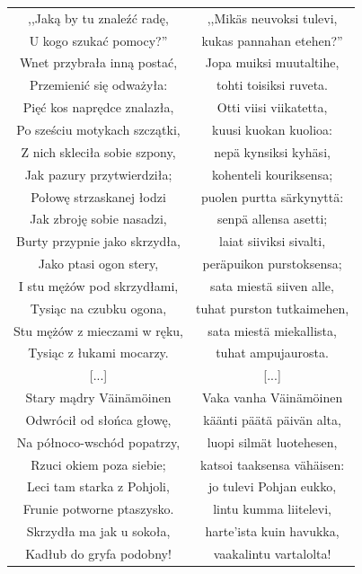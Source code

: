 \documentclass[11pt,a4paper,twoside]{report}
\begin{document}
{\centering
\small
\begin{longtable}{c c}
,,Jaką by tu znaleźć radę, & ,,Mikäs neuvoksi tulevi, \\
U kogo szukać pomocy?'' & kukas pannahan etehen?'' \\
Wnet przybrała inną postać, & Jopa muiksi muutaltihe, \\
Przemienić się odważyła: & tohti toisiksi ruveta. \\
Pięć kos naprędce znalazła, & Otti viisi viikatetta, \\
Po sześciu motykach szczątki, & kuusi kuokan kuolioa: \\
Z nich skleciła sobie szpony, & nepä kynsiksi kyhäsi, \\
Jak pazury przytwierdziła; & kohenteli kouriksensa; \\
Połowę strzaskanej łodzi & puolen purtta särkynyttä: \\
Jak zbroję sobie nasadzi, & senpä allensa asetti; \\
Burty przypnie jako skrzydła, & laiat siiviksi sivalti, \\
Jako ptasi ogon stery, & peräpuikon purstoksensa; \\
I stu mężów pod skrzydłami, & sata miestä siiven alle, \\
Tysiąc na czubku ogona, & tuhat purston tutkaimehen, \\
Stu mężów z mieczami w ręku, & sata miestä miekallista, \\
Tysiąc z łukami mocarzy. & tuhat ampujaurosta. \\
{[...]} & {[...]} \\
Stary mądry Väinämöinen & Vaka vanha Väinämöinen \\
Odwrócił od słońca głowę, & käänti päätä päivän alta, \\
Na północo-wschód popatrzy, & luopi silmät luotehesen, \\
Rzuci okiem poza siebie; & katsoi taaksensa vähäisen: \\
Leci tam starka z Pohjoli, & jo tulevi Pohjan eukko, \\
Frunie potworne ptaszysko. & lintu kumma liitelevi, \\
Skrzydła ma jak u sokoła, & harte'ista kuin havukka, \\
Kadłub do gryfa podobny! & vaakalintu vartalolta! \\
\end{longtable}
}
\end{document}
